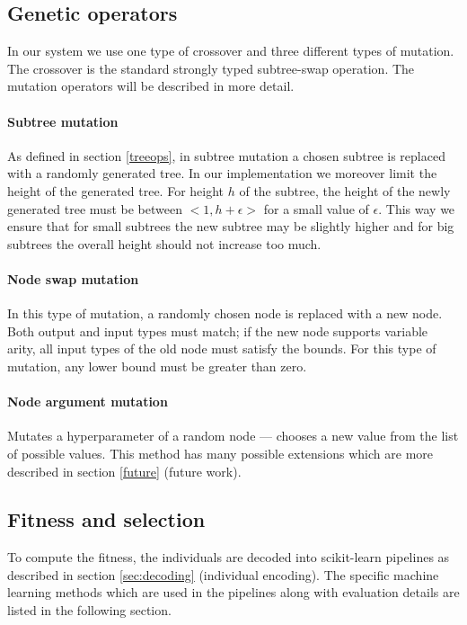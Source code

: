 \subsection{Genetic operators} \label{sec:repro}
In our system we use one type of crossover and three different types of
mutation. The crossover is the standard strongly typed subtree-swap operation.
The mutation operators will be described in more detail.

\paragraph{Subtree mutation}
As defined in section \ref{treeops}, in subtree mutation a chosen subtree is
replaced with a randomly generated tree. In our implementation we moreover
limit the height of the generated tree. For height $h$ of the subtree, the
height of the newly generated tree must be between $<1, h + \epsilon>$ for a
small value of $\epsilon$. This way we ensure that for small subtrees the new
subtree may be slightly higher and for big subtrees the overall height should
not increase too much.

\paragraph{Node swap mutation}
In this type of mutation, a randomly chosen node is replaced with a new node.
Both output and input types must match; if the new node supports variable
arity, all input types of the old node must satisfy the bounds. For this type
of mutation, any lower bound must be greater than zero.

\paragraph{Node argument mutation}
Mutates a hyperparameter of a random node --- chooses a new value from the list
of possible values. This method has many possible extensions which are more
described in section \ref{future} (future work).

\subsection{Fitness and selection} \label{sec:fitsel}
To compute the fitness, the individuals are decoded into scikit-learn 
pipelines as described in section \ref{sec:decoding} (individual encoding).
The specific machine learning methods which are used in the pipelines along
with evaluation details are listed in the following section.

